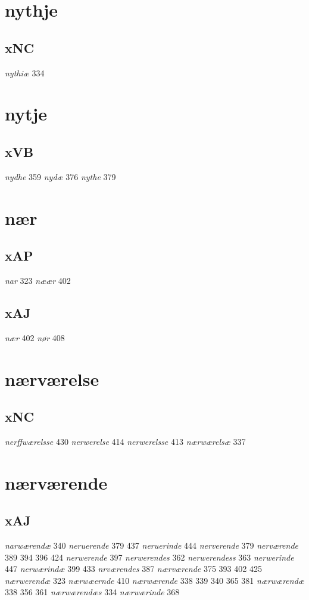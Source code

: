 \documentclass[a4paper,twocolumn]{article}
\begin{document}
\section{nythje}
\label{sec:org41c6f47}
\subsection{xNC}
\label{sec:org5afecc2}
\emph{nythiæ} 334 
\section{nytje}
\label{sec:org7c68c2f}
\subsection{xVB}
\label{sec:org1c2a771}
\emph{nydhe} 359 \emph{nydæ} 376 \emph{nythe} 379 
\section{nær}
\label{sec:org4b5484e}
\subsection{xAP}
\label{sec:orgd475139}
\emph{nar} 323 \emph{næær} 402 
\subsection{xAJ}
\label{sec:orgc3613ee}
\emph{nær} 402 \emph{nør} 408 
\section{nærværelse}
\label{sec:org2989359}
\subsection{xNC}
\label{sec:orgb446552}
\emph{nerffwærelsse} 430 \emph{nerwerelse} 414 \emph{nerwerelsse} 413 \emph{nærwærelsæ} 337 
\section{nærværende}
\label{sec:org53d861d}
\subsection{xAJ}
\label{sec:org0b0d6bf}
\emph{narwærendæ} 340 \emph{neruerende} 379 437 \emph{neruerinde} 444 \emph{nerverende} 379 \emph{nerværende} 389 394 396 424 \emph{nerwerende} 397 \emph{nerwerendes} 362 \emph{nerwerendess} 363 \emph{nerwerinde} 447 \emph{nerwærindæ} 399 433 \emph{nrværendes} 387 \emph{nærværende} 375 393 402 425 \emph{nærwerendæ} 323 \emph{nærwæernde} 410 \emph{nærwærende} 338 339 340 365 381 \emph{nærwærendæ} 338 356 361 \emph{nærwærendæs} 334 \emph{nærwærinde} 368 
\end{document}
